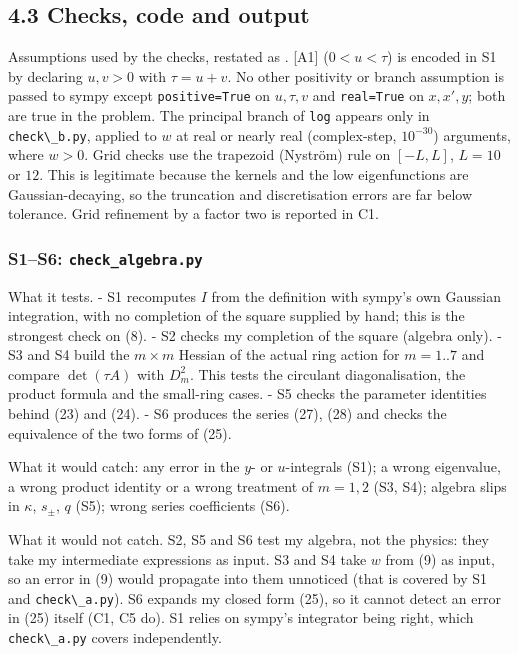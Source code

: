 \documentclass[11pt,a4paper]{article}
\newcommand{\tagmark}[1]{\marginnote{\scriptsize\ttfamily #1}}
\newcommand{\Atag}{\tagmark{[A]}}   %
\newcommand{\passthrough}[1]{#1}
\begin{document}
\hypertarget{checks-code-and-output}{%
\subsection{4.3 Checks, code and output}\label{checks-code-and-output}}

Assumptions used by the checks, restated as \Atag{}. {[}A1{]}
(\(0<u<\tau\)) is encoded in S1 by declaring \(u,v>0\) with
\(\tau = u+v\). No other positivity or branch assumption is passed to
sympy except \passthrough{\lstinline!positive=True!} on \(u,\tau,v\) and
\passthrough{\lstinline!real=True!} on \(x,x',y\); both are true in the
problem. The principal branch of \passthrough{\lstinline!log!} appears
only in \passthrough{\lstinline!check\_b.py!}, applied to \(w\) at real
or nearly real (complex-step, \(10^{-30}\)) arguments, where \(w>0\).
Grid checks use the trapezoid (Nyström) rule on \([-L,L]\), \(L = 10\)
or \(12\). This is legitimate because the kernels and the low
eigenfunctions are Gaussian-decaying, so the truncation and
discretisation errors are far below tolerance. Grid refinement by a
factor two is reported in C1.

\hypertarget{s1s6-check_algebra.py}{%
\subsubsection{\texorpdfstring{S1--S6:
\texttt{check\_algebra.py}}{S1--S6: check\_algebra.py}}\label{s1s6-check_algebra.py}}

What it tests. - S1 recomputes \(I\) from the definition with sympy's
own Gaussian integration, with no completion of the square supplied by
hand; this is the strongest check on (8). - S2 checks my completion of
the square (algebra only). - S3 and S4 build the \(m\times m\) Hessian
of the actual ring action for \(m=1..7\) and compare \(\det(\tau A)\)
with \(D_m^2\). This tests the circulant diagonalisation, the product
formula and the small-ring cases. - S5 checks the parameter identities
behind (23) and (24). - S6 produces the series (27), (28) and checks the
equivalence of the two forms of (25).

What it would catch: any error in the \(y\)- or \(u\)-integrals (S1); a
wrong eigenvalue, a wrong product identity or a wrong treatment of
\(m=1,2\) (S3, S4); algebra slips in \(\kappa\), \(s_\pm\), \(q\) (S5);
wrong series coefficients (S6).

What it would not catch. S2, S5 and S6 test my algebra, not the physics:
they take my intermediate expressions as input. S3 and S4 take \(w\)
from (9) as input, so an error in (9) would propagate into them
unnoticed (that is covered by S1 and
\passthrough{\lstinline!check\_a.py!}). S6 expands my closed form (25),
so it cannot detect an error in (25) itself (C1, C5 do). S1 relies on
sympy's integrator being right, which
\passthrough{\lstinline!check\_a.py!} covers independently.
\end{document}

